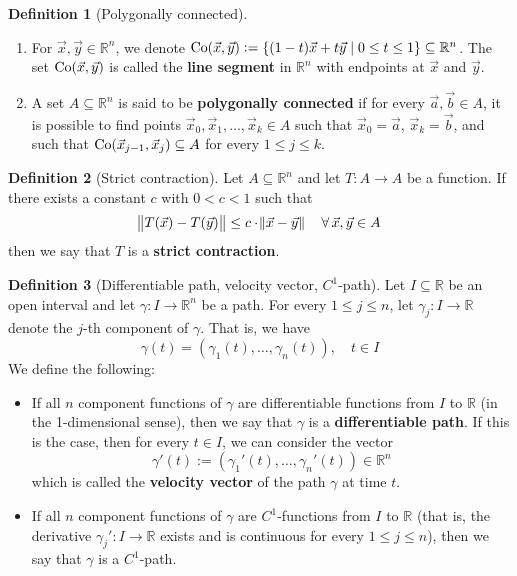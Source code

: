 \documentclass[11pt]{article}
\theoremstyle{definition}
\newtheorem*{defn*}{Definition}
\newcommand{\R}{\ensuremath{\mathbb{R}}}
\begin{document}
\begin{defn*}[Polygonally connected]~ \vspace{-1.5ex}
\begin{enumerate}[(1)]
\item For $\vec{x}, \vec{y} \in \R^n$, we denote ${\rm Co}(\vec{x}, \vec{y}) := \{(1-t)\vec{x} + t\vec{y} \mid 0 \leq t \leq 1\} \subseteq \R^n$. The set ${\rm Co}(\vec{x}, \vec{y})$ is called the {\bf line segment} in $\R^n$ with endpoints at $\vec{x}$ and $\vec{y}$.
\item A set $A \subseteq \R^n$ is said to be {\bf polygonally connected} if for every $\vec{a}, \vec{b} \in A$, it is possible to find points $\vec{x}_0, \vec{x}_1, \dots, \vec{x}_k \in A$ such that $\vec{x}_0 = \vec{a}$, $\vec{x}_k = \vec{b}$, and such that ${\rm Co}(\vec{x}_{j-1}, \vec{x}_j) \subseteq A$ for every $1 \leq j \leq k$.
\end{enumerate}
\end{defn*}

\begin{defn*}[Strict contraction]
Let $A \subseteq \R^n$ and let $T : A \to A$ be a function. If there exists a constant $c$ with $0 < c < 1$ such that
\[ \norm{T(\vec{x}) - T(\vec{y})} \leq c \cdot \norm{\vec{x} - \vec{y}} \quad \forall\, \vec{x}, \vec{y} \in A \] 
then we say that $T$ is a {\bf strict contraction}.
\end{defn*}

\begin{defn*}[Differentiable path, velocity vector, $C^1$-path]
Let $I \subseteq \R$ be an open interval and let $\gamma : I \to \R^n$ be a path. For every $1 \leq j \leq n$, let $\gamma_j : I \to \R$ denote the $j$-th component of $\gamma$. That is, we have
$$\gamma(t) = (\gamma_1(t), \dots, \gamma_n(t)), \quad t \in I$$
We define the following:
\vspace{-1.5ex}\begin{itemize}
    \item If all $n$ component functions of $\gamma$ are differentiable functions from $I$ to $\R$ (in the 1-dimensional sense), then we say that $\gamma$ is a {\bf differentiable path}. If this is the case, then for every $t \in I$, we can consider the vector
    $$\gamma'(t) := (\gamma_1'(t), \dots, \gamma_n'(t)) \in \R^n$$
    which is called the {\bf velocity vector} of the path $\gamma$ at time $t$.
    \item If all $n$ component functions of $\gamma$ are $C^1$-functions from $I$ to $\R$ (that is, the derivative $\gamma_j' : I \to \R$ exists and is continuous for every $1 \leq j \leq n$), then we say that $\gamma$ is a $C^1$-path.
\end{itemize}\vspace{-1.5ex}
\end{defn*}
\end{document}
